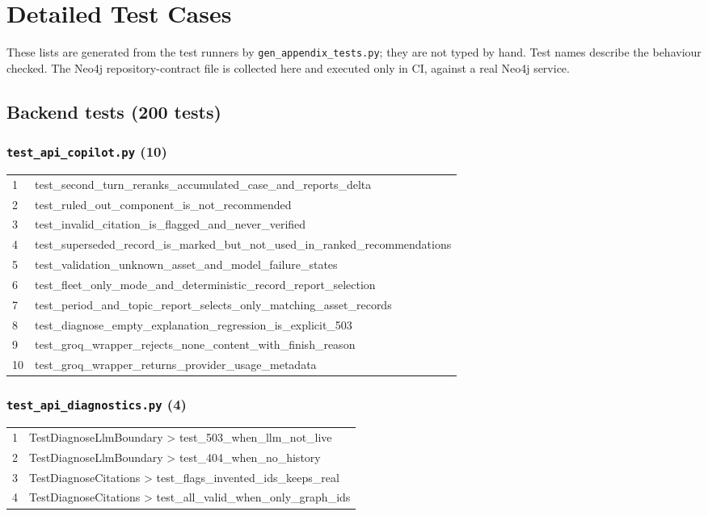 \chapter{Detailed Test Cases}\label{app:tests}
These lists are generated from the test runners by \texttt{gen\_appendix\_tests.py}; they are not typed by hand. Test names describe the behaviour checked. The Neo4j repository-contract file is collected here and executed only in CI, against a real Neo4j service.
\section{Backend tests (200 tests)}\label{app:tests-backend}
\small
\subsection*{\texttt{test\_api\_copilot.py} (10)}
\begin{longtable}{p{}p{}}
1 & test\_second\_turn\_reranks\_accumulated\_case\_and\_reports\_delta \\
2 & test\_ruled\_out\_component\_is\_not\_recommended \\
3 & test\_invalid\_citation\_is\_flagged\_and\_never\_verified \\
4 & test\_superseded\_record\_is\_marked\_but\_not\_used\_in\_ranked\_recommendations \\
5 & test\_validation\_unknown\_asset\_and\_model\_failure\_states \\
6 & test\_fleet\_only\_mode\_and\_deterministic\_record\_report\_selection \\
7 & test\_period\_and\_topic\_report\_selects\_only\_matching\_asset\_records \\
8 & test\_diagnose\_empty\_explanation\_regression\_is\_explicit\_503 \\
9 & test\_groq\_wrapper\_rejects\_none\_content\_with\_finish\_reason \\
10 & test\_groq\_wrapper\_returns\_provider\_usage\_metadata \\
\end{longtable}
\subsection*{\texttt{test\_api\_diagnostics.py} (4)}
\begin{longtable}{p{}p{}}
1 & TestDiagnoseLlmBoundary > test\_503\_when\_llm\_not\_live \\
2 & TestDiagnoseLlmBoundary > test\_404\_when\_no\_history \\
3 & TestDiagnoseCitations > test\_flags\_invented\_ids\_keeps\_real \\
4 & TestDiagnoseCitations > test\_all\_valid\_when\_only\_graph\_ids \\
\end{longtable}
